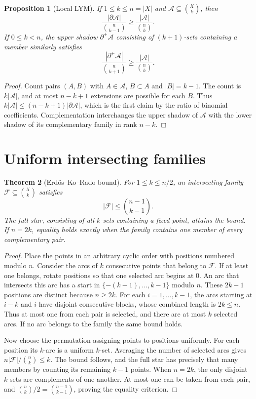 \documentclass[11pt,oneside,openany]{book}
\theoremstyle{plain}
\newtheorem{theorem}{Theorem}[chapter]
\newtheorem{proposition}[theorem]{Proposition}
\theoremstyle{definition}
\theoremstyle{remark}
\begin{document}
\begin{proposition}[Local LYM]\label{p205:W06}
If \(1\le k\le n=|X|\) and \(\mathcal A\subseteq\binom Xk\), then
\[
 \frac{|\partial\mathcal A|}{\binom n{k-1}}
 \ge \frac{|\mathcal A|}{\binom nk}.
\]
If \(0\le k<n\), the upper shadow \(\partial^+\mathcal A\) consisting
of \((k+1)\)-sets containing a member similarly satisfies
\[
 \frac{|\partial^+\mathcal A|}{\binom n{k+1}}
 \ge \frac{|\mathcal A|}{\binom nk}.
\]
\end{proposition}
\begin{proof}
Count pairs \((A,B)\) with \(A\in\mathcal A\), \(B\subset A\) and
\(|B|=k-1\). The count is \(k|\mathcal A|\), and at most
\(n-k+1\) extensions are possible for each \(B\). Thus
\(k|\mathcal A|\le(n-k+1)|\partial\mathcal A|\), which is the first
claim by the ratio of binomial coefficients. Complementation
interchanges the upper shadow of \(\mathcal A\) with the lower
shadow of its complementary family in rank \(n-k\).
\end{proof}

\section{Uniform intersecting families}

\begin{theorem}[Erd\H{o}s--Ko--Rado bound]\label{p205:W07}
For \(1\le k\le n/2\), an intersecting family
\(\mathcal F\subseteq\binom Xk\) satisfies
\[
 |\mathcal F|\le\binom{n-1}{k-1}.
\]
The full star, consisting of all \(k\)-sets containing a fixed
point, attains the bound. If \(n=2k\), equality holds exactly when
the family contains one member of every complementary pair.
\end{theorem}
\begin{proof}
Place the points in an arbitrary cyclic order with positions
numbered modulo \(n\). Consider the arcs of \(k\) consecutive points
that belong to \(\mathcal F\). If at least one belongs, rotate
positions so that one selected arc begins at \(0\). An arc that
intersects this arc has a start in
\(\{-(k-1),\ldots,k-1\}\) modulo \(n\). These \(2k-1\) positions
are distinct because \(n\ge2k\). For each \(i=1,\ldots,k-1\),
the arcs starting at \(i-k\) and \(i\) have disjoint consecutive
blocks, whose combined length is \(2k\le n\). Thus at most one
from each pair is selected, and there are at most \(k\) selected arcs.
If no arc belongs to the family the same bound holds.

Now choose the permutation assigning points to positions uniformly.
For each position its \(k\)-arc is a uniform \(k\)-set. Averaging the
number of selected arcs gives
\(n|\mathcal F|/\binom nk\le k\). The bound follows, and the full
star has precisely that many members by counting its remaining
\(k-1\) points. When \(n=2k\), the only disjoint \(k\)-sets are
complements of one another. At most one can be taken from each
pair, and \(\binom nk/2=\binom{n-1}{k-1}\), proving the equality
criterion.
\end{proof}
\end{document}

